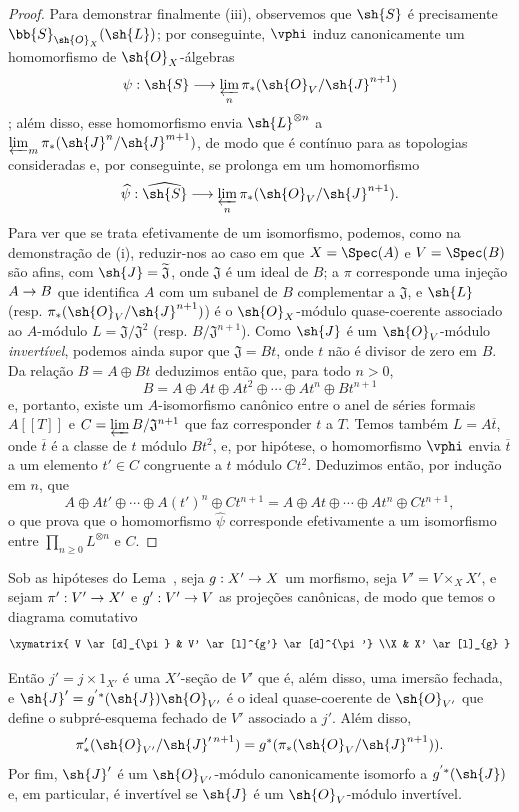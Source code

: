 \documentclass[oneside,10pt]{amsart}
\makeatletter
\renewcommand{\geq}{\geqslant}
\newcommand{\ega@arrow}[2]{\mathchoice{#1}{#2}{#2}{#2}}
\renewcommand{\to}{\ega@arrow{\longrightarrow}{\rightarrow}}
\newcommand{\oldpage}[2][]{\marginnote{\normalfont\footnotesize\textbf{#1}~|~#2}\ignorespaces}
\let\EGAOriginalLabel\label
\renewcommand{\label}[1]{\phantomsection\EGAOriginalLabel{#1}}
\makeatother
\begin{document}
\begin{proof}
Para demonstrar finalmente (iii), observemos que $\sh{S}$ é precisamente $\bb{S}_{\sh{O}_X}(\sh{L})$;
por conseguinte, $\vphi$ induz canonicamente um homomorfismo de $\sh{O}_X$-álgebras
\[
  \psi:\sh{S}\longrightarrow
  \varprojlim_n\pi_*(\sh{O}_V/\sh{J}^{n+1})
\]
;
além disso, esse homomorfismo envia $\sh{L}^{\otimes n}$ a $\varprojlim_m\pi_*(\sh{J}^n/\sh{J}^{m+1})$, de modo que é contínuo para as topologias consideradas e, por conseguinte, se prolonga em um homomorfismo
\[
  \widehat{\psi}:\widehat{\sh{S}}\longrightarrow
  \varprojlim_n\pi_*(\sh{O}_V/\sh{J}^{n+1}).
\]
Para ver que se trata efetivamente de um isomorfismo, podemos, como na demonstração de (i), reduzir-nos ao caso em que $X=\Spec(A)$ e $V=\Spec(B)$ são afins, com $\sh{J}=\widetilde{\mathfrak{J}}$, onde $\mathfrak{J}$ é um ideal de $B$;
a $\pi$ corresponde uma injeção $A\to B$ que identifica $A$ com um subanel de $B$ complementar a $\mathfrak{J}$, e $\sh{L}$ (resp. $\pi_*(\sh{O}_V/\sh{J}^{n+1})$) é o $\sh{O}_X$-módulo quase-coerente associado ao $A$-módulo $L=\mathfrak{J}/\mathfrak{J}^2$ (resp. $B/\mathfrak{J}^{n+1}$).
Como $\sh{J}$ é um $\sh{O}_V$-módulo \emph{invertível}, podemos ainda supor que $\mathfrak{J}=Bt$, onde $t$ não é divisor de zero em $B$.
Da relação $B=A\oplus Bt$ deduzimos então que, para todo $n>0$,
\[
  B=A\oplus At\oplus At^2\oplus\cdots\oplus At^n\oplus Bt^{n+1}
\]
e, portanto, existe um $A$-isomorfismo canônico entre o anel de séries formais $A[[T]]$ e $C=\varprojlim B/\mathfrak{J}^{n+1}$ que faz corresponder $t$ a $T$.
Temos também $L=A\overline{t}$, onde $\overline{t}$ é a classe de $t$ módulo $Bt^2$, e, por hipótese, o homomorfismo $\vphi$ envia $\overline{t}$ a um elemento $t'\in C$ congruente a $t$ módulo $Ct^2$.
Deduzimos então, por indução em $n$, que
\[
  A\oplus At'\oplus\cdots\oplus A(t')^n\oplus Ct^{n+1}
  =A\oplus At\oplus\cdots\oplus At^n\oplus Ct^{n+1},
\]
o que prova que o homomorfismo $\widehat{\psi}$ corresponde efetivamente a um isomorfismo entre $\prod_{n\geq0}L^{\otimes n}$ e $C$.
\end{proof}

\begin{lemma}[8.10.2]
\label{II.8.10.2}
Sob as hipóteses do Lema~, seja $g:X'\to X$ um morfismo,
\oldpage[II]{186}
seja $V'=V\times_X X'$, e sejam $\pi':V'\to X'$ e $g':V'\to V$ as projeções canônicas, de modo que temos o diagrama comutativo
\[
  \xymatrix{
    V
      \ar[d]_{\pi}
  & V'
      \ar[l]^{g'}
      \ar[d]^{\pi'}
  \\X
  & X'
      \ar[l]_{g}
  }
\]

Então $j'=j\times1_{X'}$ é uma $X'$-seção de $V'$ que é, além disso, uma imersão fechada, e $\sh{J}'=g^{'*}(\sh{J})\sh{O}_{V'}$ é o ideal quase-coerente de $\sh{O}_{V'}$ que define o subpré-esquema fechado de $V'$ associado a $j'$.
Além disso,
\[
  \pi'_*(\sh{O}_{V'}/\sh{J}'^{\,n+1})
  =g^*(\pi_*(\sh{O}_V/\sh{J}^{n+1})).
\]
Por fim, $\sh{J}'$ é um $\sh{O}_{V'}$-módulo canonicamente isomorfo a $g^{'*}(\sh{J})$ e, em particular, é invertível se $\sh{J}$ é um $\sh{O}_V$-módulo invertível.
\end{lemma}
\end{document}
